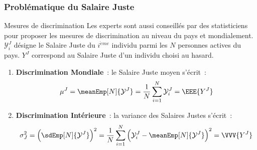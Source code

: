 \documentclass[11pt]{beamer}
\begin{document}
\begin{frame}
\frametitle{Problématique du Salaire Juste}

\begin{alertblock}{Mesures de discrimination}
Les experts sont aussi conseillés par des statisticiens pour proposer les mesures de discrimination au niveau du pays et mondialement. $\mathcal{Y}^{J}_i$ désigne le Salaire Juste du $i^{\grave eme}$ individu parmi les $N$ personnes actives du pays. $Y^{J}$ correspond au Salaire Juste d'un individu choisi au hasard.
\begin{enumerate} 
\item \textbf{Discrimination Mondiale}~:  le Salaire Juste moyen s'écrit~:
$$\mu^{J}=\meanEmp[N]{\mathcal{Y}^{J}}=\frac1N\sum_{i=1}^N \mathcal{Y}^{J}_i=\EEE{Y^{J}}$$
\item \textbf{Discrimination Intérieure}~: la variance des Salaires Justes s'écrit~:
$$\sigma^2_{J}=\Big(\sdEmp[N]{\mathcal{Y}^{J}}\Big)^2=\frac1N\sum_{i=1}^N \Big(\mathcal{Y}^{J}_i-\meanEmp[N]{\mathcal{Y}^{J}}\Big)^2=\VVV{Y^{J}}$$
\end{enumerate}
\end{alertblock}
\end{frame}
\end{document}
